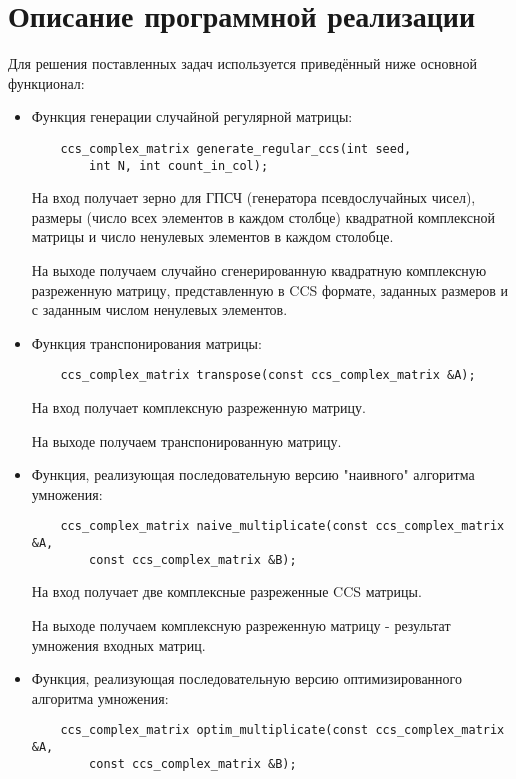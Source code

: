 \documentclass{report}
\begin{document}
	\section*{Описание программной реализации}
		\par Для решения поставленных задач используется приведённый ниже основной функционал:
		\begin{itemize}
			\item Функция генерации случайной регулярной матрицы:
			\begin{lstlisting}
    ccs_complex_matrix generate_regular_ccs(int seed, 
        int N, int count_in_col);
			\end{lstlisting}
			\par На вход получает зерно для ГПСЧ (генератора псевдослучайных чисел), размеры (число всех элементов в каждом столбце) квадратной комплексной матрицы и число ненулевых элементов в каждом столобце.
			\par На выходе получаем случайно сгенерированную квадратную комплексную разреженную матрицу, представленную в CCS формате, заданных размеров и с заданным числом ненулевых элементов.
			\item Функция транспонирования матрицы:
			\begin{lstlisting}
	ccs_complex_matrix transpose(const ccs_complex_matrix &A);
			\end{lstlisting}
			\par На вход получает комплексную разреженную матрицу.
			\par На выходе получаем транспонированную матрицу.
			\item Функция, реализующая последовательную версию "наивного"{} алгоритма умножения:
			\begin{lstlisting}
	ccs_complex_matrix naive_multiplicate(const ccs_complex_matrix &A, 
        const ccs_complex_matrix &B);
			\end{lstlisting}
			\par На вход получает две комплексные разреженные CCS матрицы. 
			\par На выходе получаем комплексную разреженную матрицу - результат умножения входных матриц.
			\item Функция, реализующая последовательную версию оптимизированного алгоритма умножения:
			\begin{lstlisting}
	ccs_complex_matrix optim_multiplicate(const ccs_complex_matrix &A, 
        const ccs_complex_matrix &B);
			\end{lstlisting}

\end{itemize}
\end{document}
